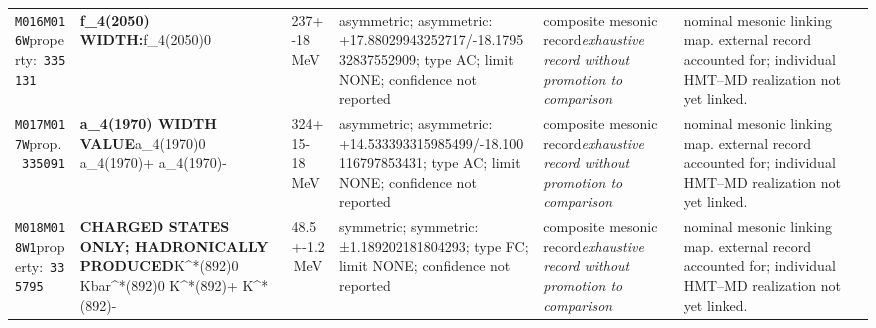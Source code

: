 \begin{landscape}
\begin{longtable}{L{1.85cm}L{4.45cm}L{2.35cm}L{4.05cm}L{3.35cm}L{7.15cm}}
\texttt{M016}\newline \texttt{M016W}\newline property:\ \texttt{335131} & \textbf{f\_\allowbreak{}4(2050) WIDTH:}\newline f\_\allowbreak{}4(2050)0 & 237+-18\,MeV & asymmetric; asymmetric: +17.88029943252717/-18.179532837552909; type AC; limit NONE; confidence not reported & composite mesonic record\newline \emph{exhaustive record without promotion to comparison} & nominal mesonic linking map. external record accounted for; individual HMT--MD realization not yet linked. \\
\texttt{M017}\newline \texttt{M017W}\newline prop.\ \texttt{335091} & \textbf{a\_\allowbreak{}4(1970) WIDTH VALUE}\newline a\_\allowbreak{}4(1970)0 \textbar{}\allowbreak{} a\_\allowbreak{}4(1970)+ \textbar{}\allowbreak{} a\_\allowbreak{}4(1970)- & 324+15-18\,MeV & asymmetric; asymmetric: +14.533393315985499/-18.100116797853431; type AC; limit NONE; confidence not reported & composite mesonic record\newline \emph{exhaustive record without promotion to comparison} & nominal mesonic linking map. external record accounted for; individual HMT--MD realization not yet linked. \\
\texttt{M018}\newline \texttt{M018W1}\newline property:\ \texttt{335795} & \textbf{CHARGED STATES ONLY; HADRONICALLY PRODUCED}\newline K\textasciicircum{}*(892)0 \textbar{}\allowbreak{} Kbar\textasciicircum{}*(892)0 \textbar{}\allowbreak{} K\textasciicircum{}*(892)+ \textbar{}\allowbreak{} K\textasciicircum{}*(892)- & 48.5+-1.2\,MeV & symmetric; symmetric: ±1.189202181804293; type FC; limit NONE; confidence not reported & composite mesonic record\newline \emph{exhaustive record without promotion to comparison} & nominal mesonic linking map. external record accounted for; individual HMT--MD realization not yet linked. \\

\end{longtable}
\end{landscape}
